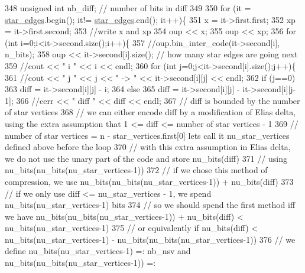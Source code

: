\begin{DoxyCode}
348   \textcolor{keywordtype}{unsigned} \textcolor{keywordtype}{int} nb\_diff; \textcolor{comment}{// number of bits in diff}
349 
350   \textcolor{keywordflow}{for} (it = \hyperlink{classmarked__graph__compressed_a7df5779d313486644132bd816937f532}{star\_edges}.begin(); it!= \hyperlink{classmarked__graph__compressed_a7df5779d313486644132bd816937f532}{star\_edges}.end(); it++)\{
351     x = it->first.first;
352     xp = it->first.second;
353     \textcolor{comment}{//write x and xp}
354     oup << x;
355     oup << xp;
356     \textcolor{keywordflow}{for} (\textcolor{keywordtype}{int} i=0;i<it->second.size();i++)\{
357       \textcolor{comment}{//oup.bin\_inter\_code(it->second[i], n\_bits);}
358       oup << it->second[i].size(); \textcolor{comment}{// how many star edges are going next}
359       \textcolor{comment}{//cout << " i " << i << endl;}
360       \textcolor{keywordflow}{for} (\textcolor{keywordtype}{int} j=0;j<it->second[i].size();j++)\{
361         \textcolor{comment}{//cout << " j " << j << " -> " << it->second[i][j] << endl;}
362         \textcolor{keywordflow}{if} (j==0)
363           diff = it->second[i][j] - i;
364         \textcolor{keywordflow}{else}
365           diff = it->second[i][j] - it->second[i][j-1];
366         \textcolor{comment}{//cerr << " diff " << diff << endl;}
367         \textcolor{comment}{// diff is bounded by the number of star vertices}
368         \textcolor{comment}{// we can either encode diff by a modification of Elias delta, using the extra assumption that 1 <=
       diff <= number of star vertices - 1}
369         \textcolor{comment}{// number of star vertices = n - star\_vertices.first[0] lets call it nu\_star\_vertices defined above
       before the loop}
370         \textcolor{comment}{// with this extra assumption in Elias delta, we do not use the unary part of the code and store
       nu\_bits(diff) }
371         \textcolor{comment}{// using nu\_bits(nu\_bits(nu\_star\_vertices-1))}
372         \textcolor{comment}{// if we chose this method of compression, we use nu\_bits(nu\_bits(nu\_star\_vertices-1)) +
       nu\_bits(diff)}
373         \textcolor{comment}{// if we only use diff <= nu\_star\_vertices - 1, we spend nu\_bits(nu\_star\_vertices-1) bits}
374         \textcolor{comment}{// so we should spend the first method iff we have nu\_bits(nu\_bits(nu\_star\_vertices-1)) +
       nu\_bits(diff) < nu\_bits(nu\_star\_vertices-1)}
375         \textcolor{comment}{// or equivalently if nu\_bits(diff) < nu\_bits(nu\_star\_vertices-1) -
       nu\_bits(nu\_bits(nu\_star\_vertices-1))}
376         \textcolor{comment}{// we define  nu\_bits(nu\_star\_vertices-1) =: nb\_nsv and nu\_bits(nu\_bits(nu\_star\_vertices-1)) =:
}
\end{DoxyCode}
